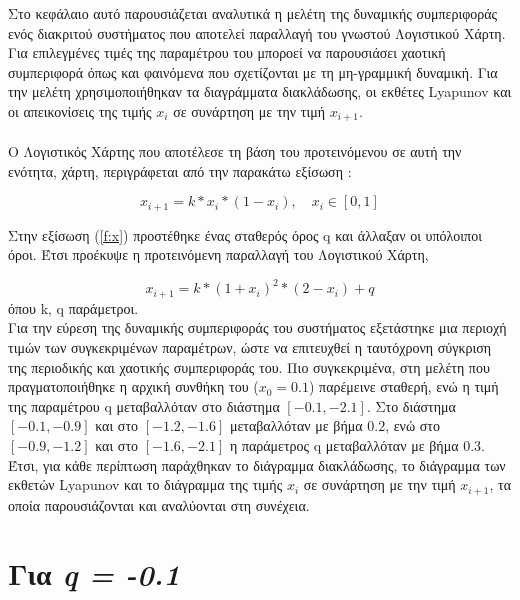 Στο κεφάλαιο αυτό παρουσιάζεται αναλυτικά η μελέτη της δυναμικής συμπεριφοράς ενός διακριτού συστήματος που αποτελεί παραλλαγή του γνωστού Λογιστικού Χάρτη. Για επιλεγμένες τιμές της παραμέτρου του μποροεί να παρουσιάσει χαοτική συμπεριφορά όπως και φαινόμενα που σχετίζονται με τη μη-γραμμική δυναμική. Για την μελέτη χρησιμοποιήθηκαν τα διαγράμματα διακλάδωσης, οι εκθέτες Lyapunov και οι απεικονίσεις της τιμής \(x_i\) σε συνάρτηση με  την τιμή \(x_{i+1}\).\\\\
Ο Λογιστικός Χάρτης που αποτέλεσε τη βάση του προτεινόμενου σε αυτή την ενότητα, χάρτη, περιγράφεται από την παρακάτω εξίσωση \cite{b10}:

\begin{equation}
	x_{i+1}=k*x_i*(1-x_i), \quad x_i \in [0,1]
	\label{f:x}
\end{equation}


Στην εξίσωση (\ref{f:x}) προστέθηκε ένας σταθερός όρος q και άλλαξαν οι υπόλοιποι όροι. Έτσι προέκυψε η προτεινόμενη παραλλαγή του Λογιστικού Χάρτη,

\begin{equation}
	x_{i+1}=k*(1+x_i)^2 *(2-x_i) +q
	\label{f:x1}
\end{equation}
όπου k, q παράμετροι.\\

Για την εύρεση της δυναμικής συμπεριφοράς του συστήματος εξετάστηκε μια περιοχή τιμών των συγκεκριμένων παραμέτρων, ώστε να επιτευχθεί η ταυτόχρονη σύγκριση της περιοδικής και χαοτικής συμπεριφοράς του. Πιο συγκεκριμένα, στη μελέτη που πραγματοποιήθηκε η αρχική συνθήκη του ($x_0 =0.1$) παρέμεινε  σταθερή, ενώ η τιμή της παραμέτρου q μεταβαλλόταν στο διάστημα $[-0.1,-2.1]$. Στο διάστημα  $[-0.1,-0.9]$ και στο $[-1.2,-1.6]$ μεταβαλλόταν με βήμα $0.2$, ενώ στο $[-0.9,-1.2]$ και στο $[-1.6,-2.1]$ η παράμετρος q μεταβαλλόταν με βήμα $0.3$. Έτσι, για κάθε περίπτωση παράχθηκαν το διάγραμμα διακλάδωσης, το διάγραμμα των εκθετών Lyapunov και το διάγραμμα της τιμής \(x_i\) σε συνάρτηση με  την τιμή \(x_{i+1}\), τα οποία παρουσιάζονται και αναλύονται στη συνέχεια.\\
\vspace{\fill}

\section{Για \emph{q = -0.1} }

